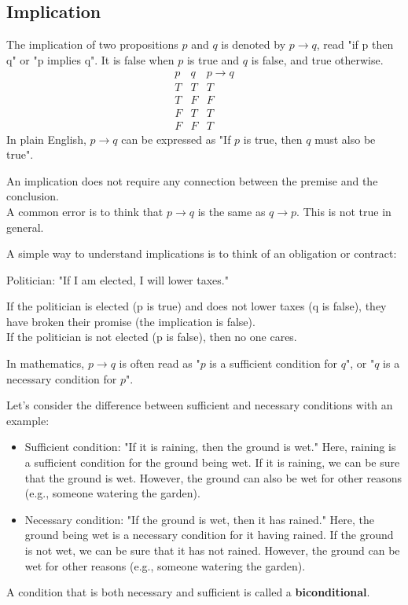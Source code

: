 \subsection{Implication}
\begin{definition}[Implication]
    The implication of two propositions $p$ and $q$ is denoted by $p \to q$, read "if p then q" or "p implies q". It is false when $p$ is true and $q$ is false, and true otherwise.
    \[
        \begin{array}{c|c|c}
            p & q & p \to q \\
            \hline
            T & T & T \\
            T & F & F \\
            F & T & T \\
            F & F & T
        \end{array}
    \]
    In plain English, $p \to q$ can be expressed as "If $p$ is true, then $q$ must also be true".
\end{definition}
An implication does not require any connection between the premise and the conclusion.\\
A common error is to think that $p \to q$ is the same as $q \to p$. This is not true in general.

\begin{eg}
    A simple way to understand implications is to think of an obligation or contract:
    \begin{center}
        Politician: "If I am elected, I will lower taxes."
    \end{center}
    If the politician is elected (p is true) and does not lower taxes (q is false), they have broken their promise (the implication is false). \\
    If the politician is not elected (p is false), then no one cares.
\end{eg}
In mathematics, $p \to q$ is often read as "$p$ is a sufficient condition for $q$", or "$q$ is a necessary condition for $p$".

\begin{eg}
    Let's consider the difference between sufficient and necessary conditions with an example:
    \begin{itemize}[itemsep=1pt,label=$\circ$]
        \item Sufficient condition: "If it is raining, then the ground is wet." Here, raining is a sufficient condition for the ground being wet. If it is raining, we can be sure that the ground is wet. However, the ground can also be wet for other reasons (e.g., someone watering the garden).
        \item Necessary condition: "If the ground is wet, then it has rained." Here, the ground being wet is a necessary condition for it having rained. If the ground is not wet, we can be sure that it has not rained. However, the ground can be wet for other reasons (e.g., someone watering the garden). 
    \end{itemize}
\end{eg}
A condition that is both necessary and sufficient is called a \textbf{biconditional}.

